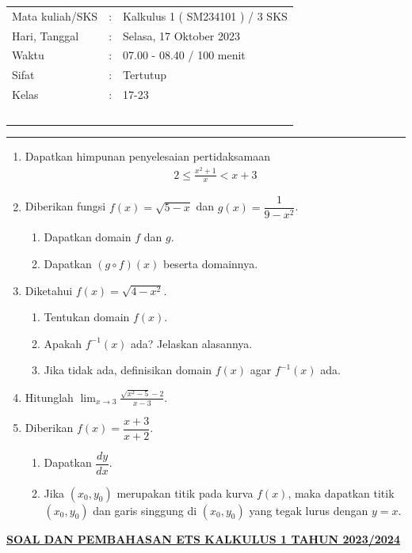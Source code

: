 \documentclass[10pt,openany,a4paper]{article}
\theoremstyle{definition}
\theoremstyle{definition}
\theoremstyle{plain}
\begin{document}
    \begin{center}
	\begin{tabular}{lcl}
		Mata kuliah/SKS & : & Kalkulus 1 ( SM234101 ) / 3 SKS\\
		Hari, Tanggal & : & Selasa, 17 Oktober 2023\\
		Waktu & : & 07.00 - 08.40 / 100 menit\\
		Sifat & : & Tertutup\\
		Kelas & : & 17-23\\
  ~
	\end{tabular}

    \noindent\rule{\textwidth}{2.pt}
        \end{center}
    \begin{enumerate}
    \item Dapatkan himpunan penyelesaian pertidaksamaan
    \begin{align*}
        2\leq\frac{x^2+1}{x}<x+3
    \end{align*}

    \item Diberikan fungsi $f(x)=\sqrt{5-x}$ dan $g(x)=\dfrac{1}{9-x^2}$.
    \begin{enumerate}
        \item Dapatkan domain $f$ dan $g$.
        \item Dapatkan $(g\circ f)(x)$ beserta domainnya.
    \end{enumerate}

    \item Diketahui $f(x)=\sqrt{4-x^2}$.
    \begin{enumerate}
        \item Tentukan domain $f(x)$.
        \item Apakah $f^{-1}(x)$ ada? Jelaskan alasannya.
        \item Jika tidak ada, definisikan domain $f(x)$ agar $f^{-1}(x)$ ada.
    \end{enumerate}

    \item Hitunglah $\displaystyle\lim_{x\to 3}\frac{\sqrt{x^2-5}-2}{x-3}$.

    \item Diberikan $f(x)=\dfrac{x+3}{x+2}$.
    \begin{enumerate}
        \item Dapatkan $\dfrac{dy}{dx}$.
        \item Jika $(x_0,y_0)$ merupakan titik pada kurva $f(x)$, maka dapatkan titik $(x_0,y_0)$ dan garis singgung di $(x_0,y_0)$ yang tegak lurus dengan $y=x$.
    \end{enumerate}
\end{enumerate}
\newpage
 \begin{center}
	{\underline{\textbf{\MakeUppercase{Soal dan Pembahasan ETS Kalkulus 1 Tahun 2023/2024}}}}
    \end{center}
\end{document}
